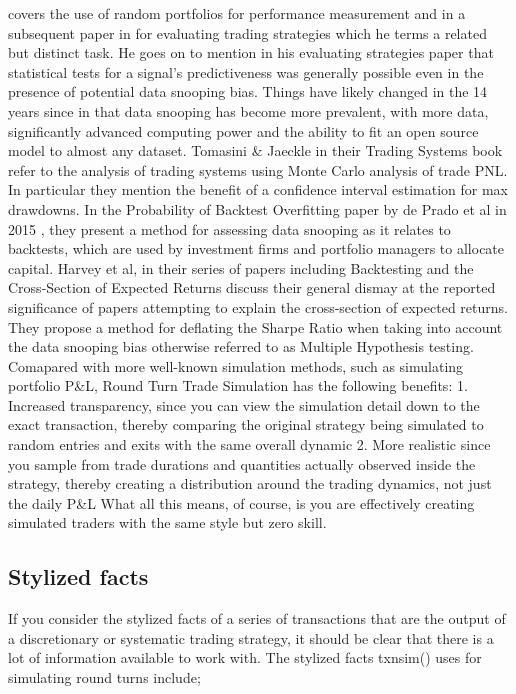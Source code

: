 \citet{@burns2004} covers the use of random portfolios for performance
measurement and in a subsequent paper in \citet{@burns2006} for
evaluating trading strategies which he terms a related but distinct
task. He goes on to mention in his evaluating strategies paper that
statistical tests for a signal's predictiveness was generally possible
even in the presence of potential data snooping bias. Things have likely
changed in the 14 years since in that data snooping has become more
prevalent, with more data, significantly advanced computing power and
the ability to fit an open source model to almost any dataset. Tomasini
\& Jaeckle in their Trading Systems book \citep{@tomasini2009} refer to
the analysis of trading systems using Monte Carlo analysis of trade PNL.
In particular they mention the benefit of a confidence interval
estimation for max drawdowns. In the Probability of Backtest Overfitting
paper by de Prado et al in 2015 \citep{@bailey2014}, they present a
method for assessing data snooping as it relates to backtests, which are
used by investment firms and portfolio managers to allocate capital.
Harvey et al, in their series of papers including Backtesting
\citep{@harvey2015} and the Cross-Section of Expected Returns
\citep{@harvey2013} discuss their general dismay at the reported
significance of papers attempting to explain the cross-section of
expected returns. They propose a method for deflating the Sharpe Ratio
when taking into account the data snooping bias otherwise referred to as
Multiple Hypothesis testing. Comapared with more well-known simulation
methods, such as simulating portfolio P\&L, Round Turn Trade Simulation
has the following benefits: 1. Increased transparency, since you can
view the simulation detail down to the exact transaction, thereby
comparing the original strategy being simulated to random entries and
exits with the same overall dynamic 2. More realistic since you sample
from trade durations and quantities actually observed inside the
strategy, thereby creating a distribution around the trading dynamics,
not just the daily P\&L What all this means, of course, is you are
effectively creating simulated traders with the same style but zero
skill.

\hypertarget{stylized-facts}{%
\subsection{Stylized facts}\label{stylized-facts}}

If you consider the stylized facts of a series of transactions that are
the output of a discretionary or systematic trading strategy, it should
be clear that there is a lot of information available to work with. The
stylized facts txnsim() uses for simulating round turns include;

